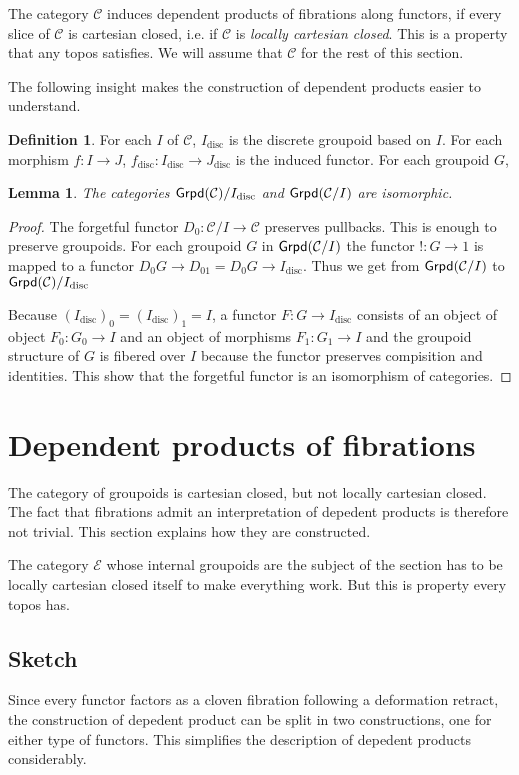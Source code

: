 \documentclass{amsart}
\theoremstyle{plain}
\newtheorem{lemma}[theorem]{Lemma}
\theoremstyle{definition}
\newtheorem{defin}[theorem]{Definition}
\newcommand\cat\mathcal
\begin{document}
The category $\cat C$ induces dependent products of fibrations along functors, if every slice of $\cat C$ is cartesian closed, i.e. if $\cat C$ is \emph{locally cartesian closed}. This is a property that any topos satisfies. We will assume that $\cat C$ for the rest of this section.

The following insight makes the construction of dependent products easier to understand.

\newcommand\disc{_\textrm{disc}}
\begin{defin} For each $I$ of $\cat C$, $I\disc$ is the discrete groupoid based on $I$. For each morphism $f:I\to J$, $f\disc:I\disc \to J\disc$ is the induced functor. For each groupoid $G$, \end{defin} %

\begin{lemma} The categories $\grpd(\cat C)/I\disc$ and $\grpd(\cat C/I)$ are isomorphic. \end{lemma}

\begin{proof} The forgetful functor $D_0:\cat C/I \to \cat C$ preserves pullbacks. This is enough to preserve groupoids. For each groupoid $G$ in $\grpd(\cat C/I)$ the functor $!:G\to 1$ is mapped to a functor $D_0G \to D_01 = D_0 G \to I\disc$. Thus we get from $\grpd(\cat C/I)$ to $\grpd(\cat C)/I\disc$

Because $(I\disc)_0 = (I\disc)_1 = I$, a functor $F:G\to I\disc$ consists of an object of object $F_0:G_0 \to I$ and an object of morphisms $F_1:G_1 \to I$ and the groupoid structure of $G$ is fibered over $I$ because the functor preserves compisition and identities. This show that the forgetful functor is an isomorphism of categories.
\end{proof}

\appendix
\section{Dependent products of fibrations}
The category of groupoids is cartesian closed, but not locally cartesian closed. The fact that fibrations admit an interpretation of depedent products is therefore not trivial. This section explains how they are constructed.

The category $\cat E$ whose internal groupoids are the subject of the section has to be locally cartesian closed itself to make everything work. But this is property every topos has.

\subsection{Sketch} Since every functor factors as a cloven fibration following a deformation retract, the construction of depedent product can be split in two constructions, one for either type of functors. This simplifies the description of depedent products considerably.
\end{document}
